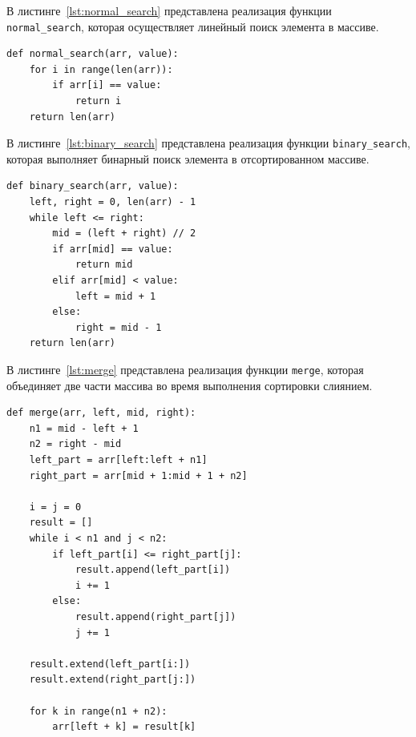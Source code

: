 \documentclass[a4paper, 12pt]{extreport}
\begin{document}
В листинге~\ref{lst:normal_search} представлена реализация функции \texttt{normal\_search}, которая осуществляет линейный поиск элемента в массиве.

\begin{center}
\captionsetup{justification=raggedright,singlelinecheck=off}
\begin{lstlisting}
def normal_search(arr, value):
    for i in range(len(arr)):
        if arr[i] == value:
            return i
    return len(arr) 
\end{lstlisting}
\captionsetup{justification=centering, singlelinecheck=off}
\label{lst:normal_search}
\end{center}

В листинге~\ref{lst:binary_search} представлена реализация функции \texttt{binary\_search}, которая выполняет бинарный поиск элемента в отсортированном массиве.

\begin{center}
\captionsetup{justification=raggedright,singlelinecheck=off}
\begin{lstlisting}
def binary_search(arr, value):
    left, right = 0, len(arr) - 1
    while left <= right:
        mid = (left + right) // 2
        if arr[mid] == value:
            return mid
        elif arr[mid] < value:
            left = mid + 1
        else:
            right = mid - 1
    return len(arr)  
\end{lstlisting}
\captionsetup{justification=centering, singlelinecheck=off}
\label{lst:binary_search}
\end{center}

В листинге~\ref{lst:merge} представлена реализация функции \texttt{merge}, которая объединяет две части массива во время выполнения сортировки слиянием.

\begin{center}
\captionsetup{justification=raggedright,singlelinecheck=off}
\begin{lstlisting}
def merge(arr, left, mid, right):
    n1 = mid - left + 1
    n2 = right - mid
    left_part = arr[left:left + n1]
    right_part = arr[mid + 1:mid + 1 + n2]
    
    i = j = 0
    result = []
    while i < n1 and j < n2:
        if left_part[i] <= right_part[j]:
            result.append(left_part[i])
            i += 1
        else:
            result.append(right_part[j])
            j += 1

    result.extend(left_part[i:])
    result.extend(right_part[j:])
    
    for k in range(n1 + n2):
        arr[left + k] = result[k]
\end{lstlisting}
\captionsetup{justification=centering, singlelinecheck=off}
\label{lst:merge}
\end{center}
\end{document}
